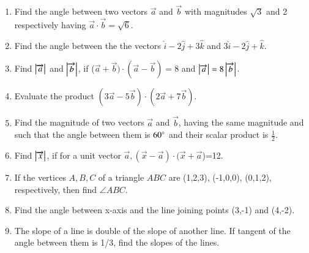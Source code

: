 \begin{enumerate}[label=\thesubsection.\arabic*,ref=\thesubsection.\theenumi]
\item Find the angle between two vectors $\overrightarrow{a}$ and $\overrightarrow {b} $ with magnitudes $\sqrt{3}$ and 2 respectively having $\overrightarrow {a}\cdot\overrightarrow {b}=\sqrt{6}$.
		\label{prob:12/10/3/1/inner}
	\\
	\solution
		
\item Find the angle between the the vectors $\hat{i}-2\hat{j}+3\hat{k}$ and $3\hat{i}-2\hat{j}+\hat{k}$.
	\\
	\solution
		
\item Find $\left\vert\overrightarrow {a}\right\vert$ and $\left\vert\overrightarrow {b}\right\vert$, if ($\overrightarrow {a}+\overrightarrow {b})\cdot (\overrightarrow {a}-\overrightarrow {b})=8$ and $\left\vert\overrightarrow {a}\right\vert=8\left\vert\overrightarrow {b}\right\vert$.
	\\
	\solution
		
\item Evaluate the product $(3\overrightarrow {a}-5\overrightarrow {b})\cdot (2\overrightarrow {a}+7\overrightarrow {b})$.
	\\
	\solution
		
\item Find the magnitude of two vectors $\overrightarrow {a}$ and $\overrightarrow {b}$, having the same magnitude and such that the angle between them is $60\degree$ and their scalar product is $\frac{1}{2}$.
	\\
	\solution
		
\item Find $\left\vert\overrightarrow {x}\right\vert$, if for a unit vector $\overrightarrow {a}, (\overrightarrow {x}-\overrightarrow {a})\cdot (\overrightarrow {x}+\overrightarrow {a}$)=12.
	\\
\solution 
		
\item If the vertices $A,B,C$ of a triangle $ABC$ are (1,2,3), (-1,0,0), (0,1,2), respectively, then find  $\angle{ABC}$.
	\\
	\solution
		
\item Find the angle between x-axis and the line joining points (3,-1) and (4,-2).
\label{chapters/11/10/1/10}
\\
\solution 

	\item The slope of a line is double of the slope of another line. If tangent of the angle between them is 1/3, find the slopes of the lines.

\end{enumerate}
